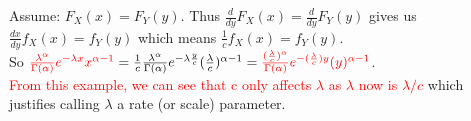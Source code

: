 \documentclass{article}
\begin{document}
\begin{enumerate}
    Assume: $F_X(x)=F_Y(y)$. Thus $\frac{d}{dy}F_X(x)=\frac{d}{dy}F_Y(y)$ gives us $\frac{dx}{dy}f_X(x)=f_Y(y)$ which means $\frac{1}{c}f_X(x)=f_Y(y)$.\\
    So $\textcolor{red}{\frac{\lambda^{\alpha}}{\Gamma(\alpha)}e^{-\lambda x}x^{\alpha-1}}
    =\frac{1}{c}\frac{\lambda^{\alpha}}{\Gamma(\alpha)}e^{-\lambda \frac{y}{c}}(\frac{\lambda}{c})^{\alpha-1}
    =\textcolor{red}{\frac{(\frac{\lambda}{c})^{\alpha}}{\Gamma(\alpha)}e^{-(\frac{\lambda}{c}) y}(y)^{\alpha-1}}$.\\
    \textcolor{red}{From this example, we can see that c only affects $\lambda$ as $\lambda$ now is $\lambda/c$} which justifies calling $\lambda$ a rate (or scale) parameter. 

\end{enumerate}
\end{document}
